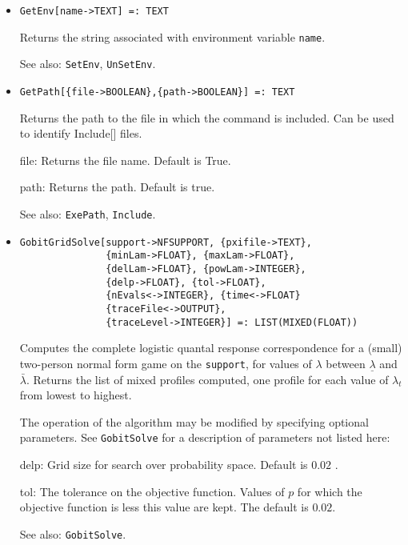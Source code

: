 \begin{itemize}
{\it for} {\tt T = FLOAT, RATIONAL}
\bd
Returns the game on which the parameter is defined.
\ed

\item
\protect \large \begin{verbatim}
GetEnv[name->TEXT] =: TEXT
\end{verbatim} \normalsize

\bd
Returns the string associated with environment variable \verb+name+.
\item [See also:] \verb+SetEnv+, \verb+UnSetEnv+.
\ed

\item
\protect \large \begin{verbatim}
GetPath[{file->BOOLEAN},{path->BOOLEAN}] =: TEXT 
\end{verbatim} \normalsize

\bd
Returns the path to the file in which the command is included.  Can be
used to identify Include[] files. 
\bd
\item [file:] Returns the file name.  Default is True.  
\item [path:] Returns the path.  Default is true. 
\ed
\item [See also:] \verb+ExePath+, \verb+Include+.
\ed

\item
\protect \large \begin{verbatim}
GobitGridSolve[support->NFSUPPORT, {pxifile->TEXT},
               {minLam->FLOAT}, {maxLam->FLOAT}, 
               {delLam->FLOAT}, {powLam->INTEGER}, 
               {delp->FLOAT}, {tol->FLOAT},
               {nEvals<->INTEGER}, {time<->FLOAT}
               {traceFile<->OUTPUT},
               {traceLevel->INTEGER}] =: LIST(MIXED(FLOAT))
\end{verbatim}\normalsize

\bd
Computes the complete logistic quantal response correspondence for
a (small) two-person normal form game on the \verb+support+, for values of
$\lambda$ between $\underline{\lambda}$ and $\bar{\lambda}.$ Returns
the list of mixed profiles computed, one profile for each value of
$\lambda_t$ from lowest to highest.

The operation of the algorithm may be modified by specifying optional
parameters.  See \verb+GobitSolve+ for a description of parameters
not listed here:
\bd
\item
[delp:] Grid size for search over probability space.  Default is $0.02$ .
\item
[tol:] The tolerance on the objective function.  Values of $p$ for
which the objective function is less this value are kept.  The default
is $0.02$.  
\ed
\item [See also:] \verb+GobitSolve+.
\ed


\end{itemize}
